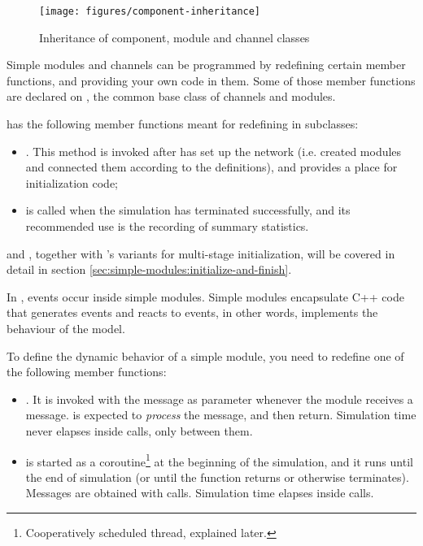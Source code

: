 \begin{figure}[htbp]
  \begin{center}
    \texttt{[image: figures/component-inheritance]}
    \caption{Inheritance of component, module and channel classes}
  \end{center}
\end{figure}

Simple modules and channels can be programmed by redefining certain
member functions, and providing your own code in them. Some of those
member functions are declared on , the common base
class of channels and modules.

 has the following member functions meant for
redefining in subclasses:

\begin{itemize}
  \item {}. This method is invoked after {\opp} has
    set up the network (i.e. created modules and connected them according
    to the definitions), and provides a place for initialization code;
  \item {} is called when the simulation has terminated
    successfully, and its recommended use is the recording of summary
    statistics.
\end{itemize}

 and , together with 's
variants for multi-stage initialization, will be covered in detail in
section \ref{sec:simple-modules:initialize-and-finish}.


In {\opp}, events occur inside simple modules.
Simple modules encapsulate C++ code that generates events and reacts to events,
in other words, implements the behaviour of the model.

To define the dynamic behavior of a simple module, you need to redefine one
of the following member functions:

\begin{itemize}
  \item {}. It
     is invoked with the message as parameter whenever the
     module receives a message.  is
     expected to \textit{process} the message, and then return.
     Simulation time never elapses inside 
     calls, only between them.
  \item {} is started as a coroutine\footnote{Cooperatively
     scheduled thread, explained later.} at the beginning of the simulation, and
     it runs until the end of simulation (or until the function
     returns or otherwise terminates). Messages are obtained with
      calls. Simulation time elapses inside
      calls.
\end{itemize}

